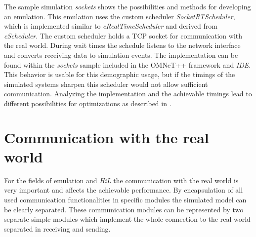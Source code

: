 The sample simulation \emph{sockets} shows the possibilities and methods for developing an emulation.
This emulation uses the custom scheduler \emph{SocketRTScheduler}, which is implemented similar to \emph{cRealTimeScheduler} and derived from \emph{cScheduler}.
The custom scheduler holds a TCP socket for communication with the real world.
During wait times the schedule listens to the network interface and converts receiving data to simulation events.
The implementation can be found within the \emph{sockets} sample included in the OMNeT++ framework and \emph{IDE}.
This behavior is usable for this demographic usage, but if the timings of the simulated systems sharpen this scheduler would not allow sufficient communication.
Analyzing the implementation and the achievable timings lead to different possibilities for optimizations as described in \cite{scussel_improvements_2015}.

\section{Communication with the real world}
\label{sec:emulation_communication}
For the fields of emulation and \emph{HiL} the communication with the real world is very important and affects the achievable performance.
By encapsulation of all used communication functionalities in specific modules the simulated model can be clearly separated.
These communication modules can be represented by two separate simple modules which implement the whole connection to the real world separated in receiving and sending.


